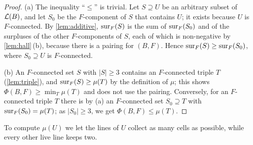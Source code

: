 \begin{proof}
(a) The inequality ``$\le$'' is trivial. Let $S\supseteq U$ be an arbitrary subset of $\mathcal{L}(B)$, and let
$S_0$ be the $F$-component of $S$ that contains $U$; it exists because $U$ is $F$-connected. By
\cref{lem:additive}, $\operatorname{sur}_F(S)$ is the sum of $\operatorname{sur}_F(S_0)$ and of the surpluses of the other
$F$-components of $S$, each of which is non-negative by \cref{lem:hall}\,(b), because there is a pairing
for $(B,F)$. Hence $\operatorname{sur}_F(S)\ge\operatorname{sur}_F(S_0)$, where $S_0\supseteq U$ is $F$-connected.

(b) An $F$-connected set $S$ with $|S|\ge 3$ contains an $F$-connected triple $T$ (\cref{lem:triple}), and
$\operatorname{sur}_F(S)\ge\mu(T)$ by the definition of $\mu$; this shows $\Phi(B,F)\ge\min_T\mu(T)$ and does not use the
pairing. Conversely, for an $F$-connected triple $T$ there is by (a) an $F$-connected set $S_0\supseteq T$
with $\operatorname{sur}_F(S_0)=\mu(T)$; as $|S_0|\ge 3$, we get $\Phi(B,F)\le\mu(T)$.
\end{proof}

To compute $\mu(U)$ we let the lines of $U$ collect as many cells as possible, while every other live
line keeps two.


